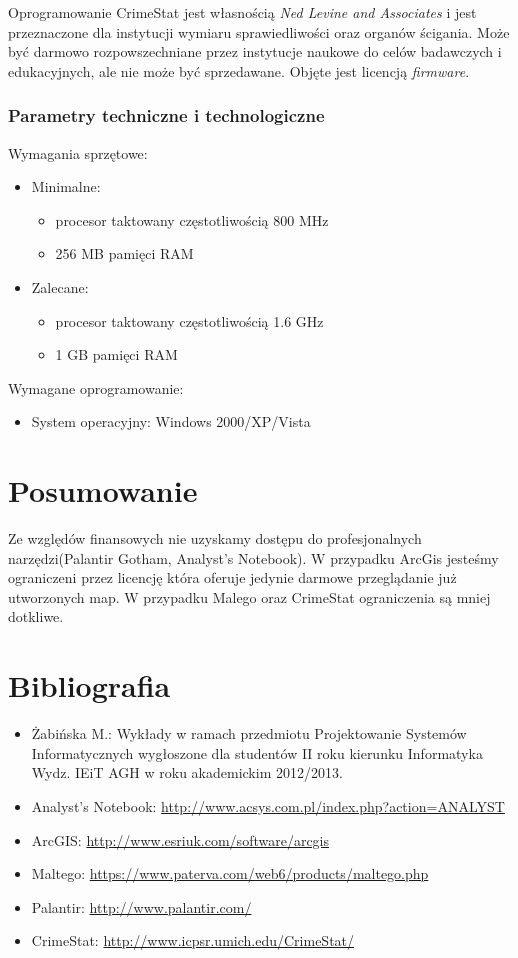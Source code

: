 \documentclass[11pt,a4paper]{article}
\begin{document}
Oprogramowanie CrimeStat jest własnością \emph{Ned Levine and Associates} i jest przeznaczone dla instytucji wymiaru sprawiedliwości oraz organów ścigania. Może być darmowo rozpowszechniane przez instytucje naukowe do celów badawczych i edukacyjnych, ale nie może być sprzedawane. Objęte jest licencją \emph{firmware}.

\subsubsection*{Parametry techniczne i technologiczne}

Wymagania sprzętowe:
\begin{itemize}
	\item Minimalne:
		\begin{itemize}
			\item procesor taktowany częstotliwością 800 MHz
    		\item 256 MB pamięci RAM
		\end{itemize}
	\item Zalecane: 
		\begin{itemize}
			\item procesor taktowany częstotliwością 1.6 GHz
    		\item 1 GB pamięci RAM
		\end{itemize}
\end{itemize}

\raggedright{Wymagane oprogramowanie:}
\begin{itemize}
	\item System operacyjny:  Windows 2000/XP/Vista
\end{itemize}

\newpage
\section{Posumowanie}
 Ze względów finansowych nie uzyskamy dostępu do profesjonalnych narzędzi(Palantir Gotham, Analyst's Notebook). W przypadku ArcGis jesteśmy ograniczeni przez licencję która oferuje jedynie darmowe przeglądanie już utworzonych map. W przypadku Malego oraz CrimeStat ograniczenia są mniej dotkliwe. 

\newpage
\section{Bibliografia}

\begin{itemize}
	\item Żabińska M.: Wykłady w ramach przedmiotu Projektowanie Systemów Informatycznych wygłoszone dla studentów II roku kierunku Informatyka Wydz. IEiT AGH w roku akademickim 2012/2013.
	\item Analyst’s Notebook: \url{http://www.acsys.com.pl/index.php?action=ANALYST}
	\item ArcGIS: \url{http://www.esriuk.com/software/arcgis}
	\item Maltego: \url{https://www.paterva.com/web6/products/maltego.php}
	\item Palantir: \url{http://www.palantir.com/}
	\item CrimeStat: \url{http://www.icpsr.umich.edu/CrimeStat/}
\end{itemize}
\end{document}
